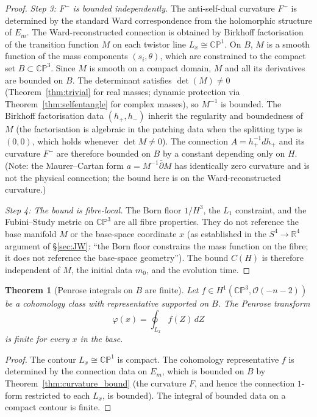 \documentclass[11pt,a4paper]{article}
\newtheorem{theorem}{Theorem}[section]
\theoremstyle{definition}
\theoremstyle{remark}
\newcommand{\CP}{\mathbb{CP}}
\newcommand{\R}{\mathbb{R}}
\newcommand{\dbar}{\bar{\partial}}
\begin{document}
\begin{proof}
\emph{Step 3: $F^-$ is bounded independently.} The anti-self-dual curvature $F^-$ is determined by the standard Ward correspondence from the holomorphic structure of $E_m$. The Ward-reconstructed connection is obtained by Birkhoff factorisation of the transition function $M$ on each twistor line $L_x\cong\CP^1$. On $B$, $M$ is a smooth function of the mass components $(s_i,\theta)$, which are constrained to the compact set $B\subset\CP^3$. Since $M$ is smooth on a compact domain, $M$ and all its derivatives are bounded on $B$. The determinant satisfies $\det(M)\neq 0$ (Theorem~\ref{thm:trivial} for real masses; dynamic protection via Theorem~\ref{thm:selfentangle} for complex masses), so $M^{-1}$ is bounded. The Birkhoff factorisation data $(h_+,h_-)$ inherit the regularity and boundedness of $M$ (the factorisation is algebraic in the patching data when the splitting type is $(0,0)$, which holds whenever $\det M\neq 0$). The connection $A=h_+^{-1}dh_+$ and its curvature $F^-$ are therefore bounded on $B$ by a constant depending only on $H$. (Note: the Maurer--Cartan form $a=M^{-1}\dbar M$ has identically zero curvature and is not the physical connection; the bound here is on the Ward-reconstructed curvature.)

\emph{Step 4: The bound is fibre-local.} The Born floor $1/H^3$, the $L_1$ constraint, and the Fubini--Study metric on $\CP^3$ are all fibre properties. They do not reference the base manifold $M$ or the base-space coordinate $x$ (as established in the $S^4\to\R^4$ argument of \S\ref{sec:JW}: ``the Born floor constrains the mass function on the fibre; it does not reference the base-space geometry''). The bound $C(H)$ is therefore independent of $M$, the initial data $m_0$, and the evolution time.
\end{proof}

\begin{theorem}[Penrose integrals on $B$ are finite]\label{thm:penrose_finite}
Let $f\in H^1(\CP^3,\mathcal{O}(-n-2))$ be a cohomology class with representative supported on $B$. The Penrose transform
\begin{equation}
\varphi(x)=\oint_{L_x}f(Z)\,dZ
\end{equation}
is finite for every $x$ in the base.
\end{theorem}

\begin{proof}
The contour $L_x\cong\CP^1$ is compact. The cohomology representative $f$ is determined by the connection data on $E_m$, which is bounded on $B$ by Theorem~\ref{thm:curvature_bound} (the curvature $F$, and hence the connection $1$-form restricted to each $L_x$, is bounded). The integral of bounded data on a compact contour is finite.
\end{proof}
\end{document}
